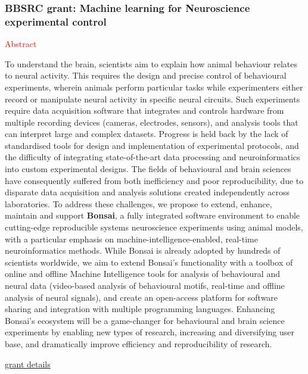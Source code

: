\begin{frame}
    \frametitle{BBSRC grant: Machine learning for Neuroscience experimental
    control}

    \textcolor{red}{Abstract}

    \tiny
    To understand the brain, scientists aim to explain how animal behaviour
    relates to neural activity. This requires the design and precise control of
    behavioural experiments, wherein animals perform particular tasks while
    experimenters either record or manipulate neural activity in specific
    neural circuits. Such experiments require data acquisition software that
    integrates and controls hardware from multiple recording devices (cameras,
    electrodes, sensors), and analysis tools that can interpret large and
    complex datasets. Progress is held back by the lack of standardised tools
    for design and implementation of experimental protocols, and the difficulty
    of integrating state-of-the-art data processing and neuroinformatics into
    custom experimental designs. The fields of behavioural and brain sciences
    have consequently suffered from both inefficiency and poor reproducibility,
    due to disparate data acquisition and analysis solutions created
    independently across laboratories. To address these challenges, we propose
    to extend, enhance, maintain and support \textbf{Bonsai}, a fully
    integrated software environment to enable cutting-edge reproducible systems
    neuroscience experiments using animal models, with a particular emphasis on
    machine-intelligence-enabled, real-time neuroinformatics methods. While
    Bonsai is already adopted by hundreds of scientists worldwide, we aim to
    extend Bonsai's functionality with a toolbox of online and offline Machine
    Intelligence tools for analysis of behavioural and neural data (video-based
    analysis of behavioural motifs, real-time and offline analysis of neural
    signals), and create an open-access platform for software sharing and
    integration with multiple programming languages. Enhancing Bonsai's
    ecosystem will be a game-changer for behavioural and brain science
    experiments by enabling new types of research, increasing and diversifying
    user base, and dramatically improve efficiency and reproducibility of
    research.

    \hfill\href{https://gow.bbsrc.ukri.org/grants/AwardDetails.aspx?FundingReference=BB\%2FW019132\%2F1}{grant
    details}

\end{frame}

